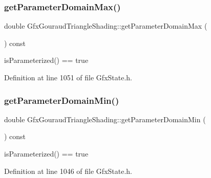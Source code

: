 \subsubsection{\texorpdfstring{get\+Parameter\+Domain\+Max()}{getParameterDomainMax()}}
{\footnotesize\ttfamily double Gfx\+Gouraud\+Triangle\+Shading\+::get\+Parameter\+Domain\+Max (\begin{DoxyParamCaption}{ }\end{DoxyParamCaption}) const\hspace{0.3cm}{\ttfamily [inline]}}

is\+Parameterized() == true 

Definition at line 1051 of file Gfx\+State.\+h.

\mbox{\label{class_gfx_gouraud_triangle_shading_a702b7864620fa2b509f58354343653c2}} 
\subsubsection{\texorpdfstring{get\+Parameter\+Domain\+Min()}{getParameterDomainMin()}}
{\footnotesize\ttfamily double Gfx\+Gouraud\+Triangle\+Shading\+::get\+Parameter\+Domain\+Min (\begin{DoxyParamCaption}{ }\end{DoxyParamCaption}) const\hspace{0.3cm}{\ttfamily [inline]}}

is\+Parameterized() == true 

Definition at line 1046 of file Gfx\+State.\+h.

\mbox{\label{class_gfx_gouraud_triangle_shading_ae22356d46b989547db9dbb247ed34bad}} 
